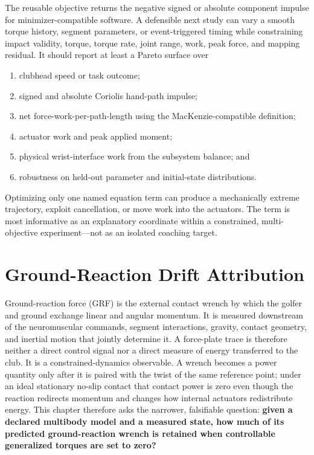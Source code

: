 \documentclass[
  letterpaper,
]{report}
\providecommand{\tightlist}{%
  \setlength{\itemsep}{0pt}\setlength{\parskip}{0pt}}
\begin{document}
The reusable objective returns the negative signed or absolute component
impulse for minimizer-compatible software. A defensible next study can
vary a smooth torque history, segment parameters, or event-triggered
timing while constraining impact validity, torque, torque rate, joint
range, work, peak force, and mapping residual. It should report at least
a Pareto surface over

\begin{enumerate}
\def\labelenumi{\arabic{enumi}.}
\tightlist
\item
  clubhead speed or task outcome;
\item
  signed and absolute Coriolis hand-path impulse;
\item
  net force-work-per-path-length using the MacKenzie-compatible
  definition;
\item
  actuator work and peak applied moment;
\item
  physical wrist-interface work from the subsystem balance; and
\item
  robustness on held-out parameter and initial-state distributions.
\end{enumerate}

Optimizing only one named equation term can produce a mechanically
extreme trajectory, exploit cancellation, or move work into the
actuators. The term is most informative as an explanatory coordinate
within a constrained, multi-objective experiment---not as an isolated
coaching target.

\chapter{Ground-Reaction Drift
Attribution}\label{ground-reaction-drift-attribution}

Ground-reaction force (GRF) is the external contact wrench by which the
golfer and ground exchange linear and angular momentum. It is measured
downstream of the neuromuscular commands, segment interactions, gravity,
contact geometry, and inertial motion that jointly determine it. A
force-plate trace is therefore neither a direct control signal nor a
direct measure of energy transferred to the club. It is a
constrained-dynamics observable. A wrench becomes a power quantity only
after it is paired with the twist of the same reference point; under an
ideal stationary no-slip contact that contact power is zero even though
the reaction redirects momentum and changes how internal actuators
redistribute energy. This chapter therefore asks the narrower,
falsifiable question: \textbf{given a declared multibody model and a
measured state, how much of its predicted ground-reaction wrench is
retained when controllable generalized torques are set to zero?}
\end{document}
